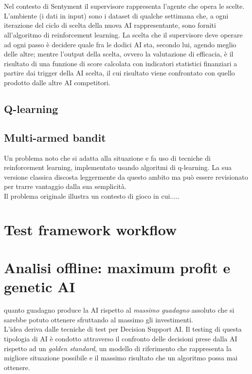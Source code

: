 \documentclass[a4paper,12pt]{report}
\begin{document}
\\~\\Nel contesto di Sentyment il supervisore rappresenta l'agente che opera le scelte. L'ambiente (i dati in input) sono i dataset di qualche settimana che, a ogni iterazione del ciclo di scelta della nuova AI rappresentante, sono forniti all'algoritmo di reinforcement learning. La scelta che il supervisore deve operare ad ogni passo è decidere quale fra le dodici AI sta, secondo lui, agendo meglio delle altre; mentre l'output della scelta, ovvero la valutazione di efficacia, è il risultato di una funzione di score calcolata con indicatori statistici finanziari a partire dai trigger della AI scelta, il cui risultato viene confrontato con quello prodotto dalle altre AI competitori.

\subsection{Q-learning}


\subsection{Multi-armed bandit}
Un problema noto che si adatta alla situazione e fa uso di tecniche di reinforcement learning, implementato usando algoritmi di q-learning. La sua versione classica discosta leggermente da questo ambito ma può essere revisionato per trarre vantaggio dalla sua semplicità.\cite{rl}\\
Il problema originale illustra un contesto di gioco in cui.....

\section{Test framework workflow}

\section{Analisi offline: maximum profit e genetic AI}
quanto guadagno produce la AI rispetto al \textit{massimo guadagno} assoluto che si sarebbe potuto ottenere sfruttando al massimo gli investimenti.\\ L'idea deriva dalle tecniche di test per Decision Support AI. Il testing di questa tipologia di AI è condotto attraverso il confronto delle decisioni prese dalla AI rispetto ad un \textit{golden standard}, un modello di riferimento che rappresenta la migliore situazione possibile e il massimo risultato che un algoritmo possa mai ottenere.
\end{document}
